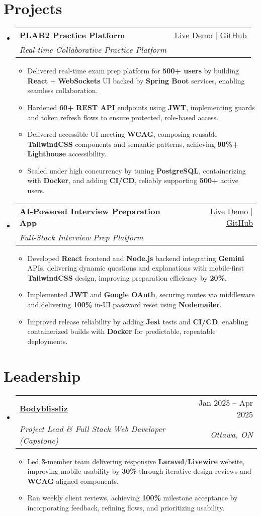 \documentclass[letterpaper,11pt]{article}
\makeatletter
\newcommand{\resumeItem}[1]{\item\small{#1 \vspace{-2pt}}}
\newcommand{\resumeSubheading}[4]{
  \vspace{-1pt}\item
    \begin{tabular*}{0.97\textwidth}[t]{l@{\extracolsep{\fill}}r}
      \textbf{#1} & #2 \\
      \textit{\small#3} & \textit{\small #4} \\
    \end{tabular*}\vspace{-5pt}
}
\newcommand{\resumeSubHeadingListStart}{\begin{itemize}[leftmargin=*]}
\newcommand{\resumeSubHeadingListEnd}{\end{itemize}}
\newcommand{\resumeItemListStart}{\begin{itemize}}
\newcommand{\resumeItemListEnd}{\end{itemize}\vspace{-5pt}}
\makeatother
\begin{document}
\section{Projects}
  \resumeSubHeadingListStart
    \resumeSubheading
      {\textbf{PLAB2 Practice Platform}}{\href{https://plab2practice.com}{Live Demo} | \href{https://github.com/altansaid/plab2projectnew}{GitHub}}
      {Real-time Collaborative Practice Platform}{}
      \resumeItemListStart
        \resumeItem{Delivered real-time exam prep platform for \textbf{500+ users} by building \textbf{React} + \textbf{WebSockets} UI backed by \textbf{Spring Boot} services, enabling seamless collaboration.}
        \resumeItem{Hardened \textbf{60+} \textbf{REST API} endpoints using \textbf{JWT}, implementing guards and token refresh flows to ensure protected, role-based access.}
        \resumeItem{Delivered accessible UI meeting \textbf{WCAG}, composing reusable \textbf{TailwindCSS} components and semantic patterns, achieving \textbf{90\%+} \textbf{Lighthouse} accessibility.}
        \resumeItem{Scaled under high concurrency by tuning \textbf{PostgreSQL}, containerizing with \textbf{Docker}, and adding \textbf{CI/CD}, reliably supporting \textbf{500+} active users.}
      \resumeItemListEnd

    \resumeSubheading
      {\textbf{AI-Powered Interview Preparation App}}{\href{https://interviewcoach-ai.vercel.app}{Live Demo} | \href{https://github.com/altansaid/interviewcoach-ai}{GitHub}}
      {Full-Stack Interview Prep Platform}{}
      \resumeItemListStart
        \resumeItem{Developed \textbf{React} frontend and \textbf{Node.js} backend integrating \textbf{Gemini} APIs, delivering dynamic questions and explanations with mobile-first \textbf{TailwindCSS} design, improving preparation efficiency by \textbf{20\%}.}
        \resumeItem{Implemented \textbf{JWT} and \textbf{Google OAuth}, securing routes via middleware and delivering \textbf{100\%} in-UI password reset using \textbf{Nodemailer}.}
        \resumeItem{Improved release reliability by adding \textbf{Jest} tests and \textbf{CI/CD}, enabling containerized builds with \textbf{Docker} for predictable, repeatable deployments.}
      \resumeItemListEnd
  \resumeSubHeadingListEnd

\section{Leadership}
  \resumeSubHeadingListStart
    \resumeSubheading
      {\href{https://www.bodyblissliz.com}{Bodyblissliz}}{Jan 2025 -- Apr 2025}
      {Project Lead \& Full Stack Web Developer (Capstone)}{Ottawa, ON}
      \resumeItemListStart
        \resumeItem{Led \textbf{3}-member team delivering responsive \textbf{Laravel}/\textbf{Livewire} website, improving mobile usability by \textbf{30\%} through iterative design reviews and \textbf{WCAG}-aligned components.}
        \resumeItem{Ran weekly client reviews, achieving \textbf{100\%} milestone acceptance by incorporating feedback, refining flows, and prioritizing usability.}
      \resumeItemListEnd
  \resumeSubHeadingListEnd
\end{document}
